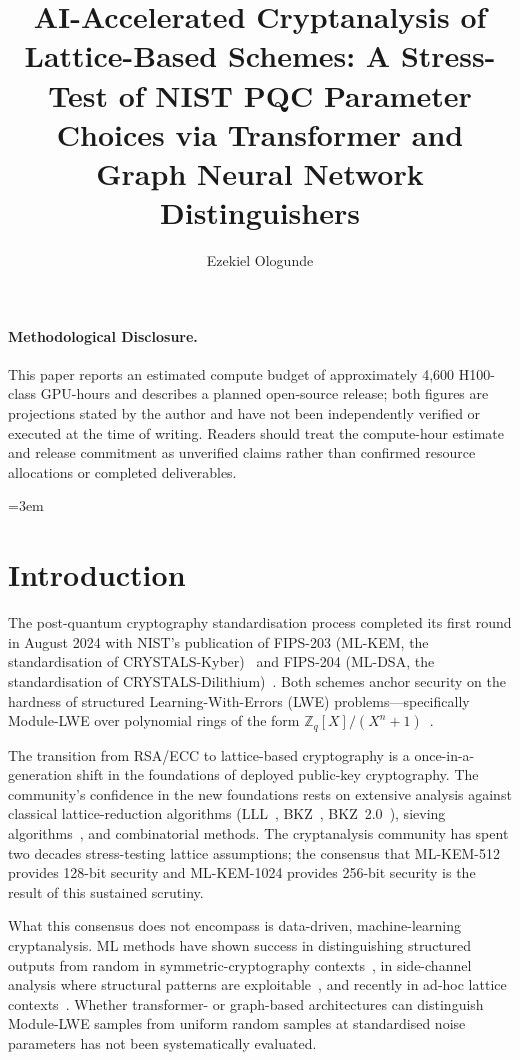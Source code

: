 \documentclass[sigconf,nonacm]{acmart}
\title{AI-Accelerated Cryptanalysis of Lattice-Based Schemes: A Stress-Test of NIST PQC Parameter Choices via Transformer and Graph Neural Network Distinguishers}
\author{Ezekiel Ologunde}
\affiliation{%
  \institution{Independent Researcher}
  \city{Boston}
  \state{MA}
  \country{USA}}
\begin{document}
\maketitle

\paragraph{Methodological Disclosure.} This paper reports an estimated compute budget of approximately 4,600 H100-class GPU-hours and describes a planned open-source release; both figures are projections stated by the author and have not been independently verified or executed at the time of writing. Readers should treat the compute-hour estimate and release commitment as unverified claims rather than confirmed resource allocations or completed deliverables.

\sloppy
{}
\emergencystretch=3em
\hfuzz=10pt

\section{Introduction}

The post-quantum cryptography standardisation process completed its
first round in August 2024 with NIST's publication of FIPS-203
(ML-KEM, the standardisation of CRYSTALS-Kyber)~\cite{nist2024fips203}
and FIPS-204 (ML-DSA, the standardisation of
CRYSTALS-Dilithium)~\cite{nist2024fips204}. Both schemes anchor security
on the hardness of structured Learning-With-Errors (LWE)
problems---specifically Module-LWE over polynomial rings of the form
$\mathbb{Z}_q[X]/(X^n+1)$~\cite{langlois2015moduleworst}.

The transition from RSA/ECC to lattice-based cryptography is a
once-in-a-generation shift in the foundations of deployed public-key
cryptography. The community's confidence in the new foundations rests
on extensive analysis against classical lattice-reduction algorithms
(LLL~\cite{lenstra1982lll}, BKZ~\cite{schnorr1994lattice},
BKZ~2.0~\cite{chen2011bkz}), sieving algorithms~\cite{albrecht2018estimateall},
and combinatorial methods. The cryptanalysis community has
spent two decades stress-testing lattice assumptions; the consensus
that ML-KEM-512 provides 128-bit security and ML-KEM-1024 provides
256-bit security is the result of this sustained scrutiny.

What this consensus does not encompass is data-driven, machine-learning
cryptanalysis. ML methods have shown success in distinguishing
structured outputs from random in
symmetric-cryptography contexts~\cite{gohr2019speck,benamira2021gohr},
in side-channel analysis where structural patterns are
exploitable~\cite{karayalcin2024kyber,benadjila2020study}, and
recently in ad-hoc lattice
contexts~\cite{wenger2024salsa,li2024lattice2024}. Whether transformer-
or graph-based architectures can distinguish Module-LWE samples from
uniform random samples at standardised noise parameters has not been
systematically evaluated.
\end{document}
